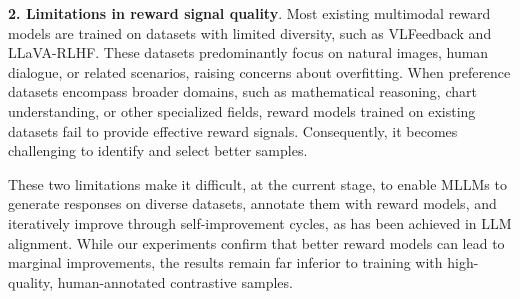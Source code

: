 \textbf{2. Limitations in reward signal quality}.
Most existing multimodal reward models are trained on datasets with limited diversity, such as VLFeedback and LLaVA-RLHF. These datasets predominantly focus on natural images, human dialogue, or related scenarios, raising concerns about overfitting. When preference datasets encompass broader domains, such as mathematical reasoning, chart understanding, or other specialized fields, reward models trained on existing datasets fail to provide effective reward signals. Consequently, it becomes challenging to identify and select better samples.

These two limitations make it difficult, at the current stage, to enable MLLMs to generate responses on diverse datasets, annotate them with reward models, and iteratively improve through self-improvement cycles, as has been achieved in LLM alignment. While our experiments confirm that better reward models can lead to marginal improvements, the results remain far inferior to training with high-quality, human-annotated contrastive samples.
